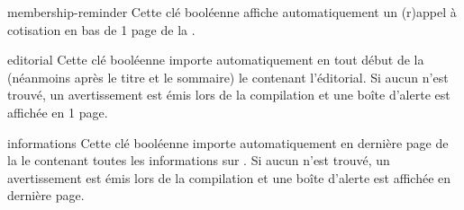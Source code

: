\documentclass{letgut}
\begin{document}
\begin{docKey}{membership-reminder}{}{}
  Cette clé booléenne affiche automatiquement un (r)appel à cotisation en bas de
  1\iere{} page de la .
\end{docKey}

\begin{docKey}{editorial}{}{}
  Cette clé booléenne importe automatiquement en tout début de la 
  (néanmoins après le titre et le sommaire) le  contenant
  l'éditorial. Si aucun  n'est trouvé, un avertissement est
  émis lors de la compilation et une boîte d'alerte est affichée en 1\iere{}
  page.
\end{docKey}

\begin{docKey}{informations}{}{}
  Cette clé booléenne importe automatiquement en dernière page de la 
  le  contenant toutes les informations sur
  \gut{}. Si aucun  n'est trouvé, un avertissement
  est émis lors de la compilation et une boîte d'alerte est affichée en dernière
  page.
\end{docKey}
\end{document}
